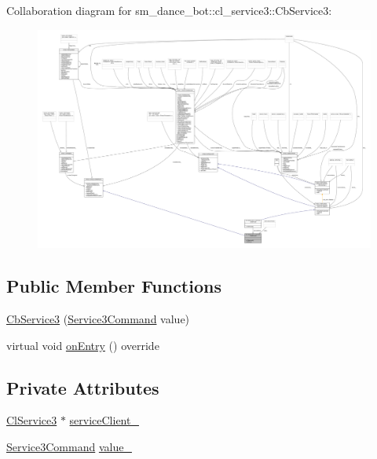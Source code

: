 Collaboration diagram for sm\+\_\+dance\+\_\+bot\+:\+:cl\+\_\+service3\+:\+:Cb\+Service3\+:\nopagebreak
\begin{figure}[H]
\begin{center}
\leavevmode
\includegraphics[width=350pt]{classsm__dance__bot_1_1cl__service3_1_1CbService3__coll__graph}
\end{center}
\end{figure}
\subsection*{Public Member Functions}
\begin{DoxyCompactItemize}
\item 
\hyperlink{classsm__dance__bot_1_1cl__service3_1_1CbService3_a0f03200cabbf54e63efb0a6db4f48ebf}{Cb\+Service3} (\hyperlink{namespacesm__dance__bot_1_1cl__service3_adbcecb84d61edff09f1fb67ef9607ac4}{Service3\+Command} value)
\item 
virtual void \hyperlink{classsm__dance__bot_1_1cl__service3_1_1CbService3_ae9e3796b507ad96cc0890fec0f64a4b7}{on\+Entry} () override
\end{DoxyCompactItemize}
\subsection*{Private Attributes}
\begin{DoxyCompactItemize}
\item 
\hyperlink{classsm__dance__bot_1_1cl__service3_1_1ClService3}{Cl\+Service3} $\ast$ \hyperlink{classsm__dance__bot_1_1cl__service3_1_1CbService3_aad53b5aa5eb595c5add3701cfe72079c}{service\+Client\+\_\+}
\item 
\hyperlink{namespacesm__dance__bot_1_1cl__service3_adbcecb84d61edff09f1fb67ef9607ac4}{Service3\+Command} \hyperlink{classsm__dance__bot_1_1cl__service3_1_1CbService3_a9df8640d9bc42607256ca76df60a5af0}{value\+\_\+}
\end{DoxyCompactItemize}
